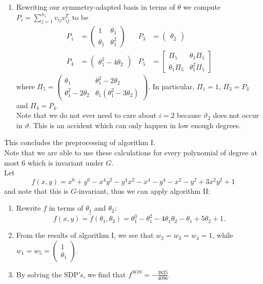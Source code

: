 \documentclass[]{article}
\begin{document}
\begin{enumerate}
    \item Rewriting our symmetry-adapted basis in terms of $\theta$ we compute $P_i=\sum_{j=1}^{n_i} v_{ij}v_{ij}^T$ to be
    \begin{align*}
        P_1&=\begin{pmatrix}1&\theta_1\\\theta_1&\theta_1^2\end{pmatrix}&
        P_3&=\begin{pmatrix}\theta_2\end{pmatrix}\\
        P_4&=\begin{pmatrix}\theta_1^2-4\theta_2\end{pmatrix}&
        P_5&=\begin{bmatrix}\Pi_5&\theta_1\Pi_5\\\theta_1\Pi_5&\theta_1^2\Pi_5\end{bmatrix}
    \end{align*}
    where $\Pi_5=\begin{pmatrix}\theta_1&\theta_1^2-2\theta_2\\\theta_1^2-2\theta_2&\theta_1(\theta_1^2-3\theta_2)\end{pmatrix}$. In particular, $\Pi_1=1$,  $\Pi_3=P_3$ and $\Pi_4=P_4$.\\
    Note that we do not ever need to care about $i=2$ because $\vartheta_2$ does not occur in $\vartheta$. This is an accident which can only happen in low enough degrees.\\
\end{enumerate}

This concludes the preprocessing of algorithm I.\\
Note that we are able to use these calculations for every polynomial of degree at most 6 which is invariant under $G$.\\


Let 
\[
    f(x,y)=x^6+y^6-x^4y^2-y^4x^2-x^4-y^4-x^2-y^2+3x^2y^2+1
\]
and note that this is $G$-invariant, thus we can apply algorithm II:
\begin{enumerate}
    \item Rewrite $f$ in terms of $\theta_1$ and $\theta_2$:
    \[
        f(x,y)=\tilde{f}(\theta_1,\theta_2)=\theta_1^3-\theta_1^2-4\theta_1\theta_2-\theta_1+5\theta_2+1.
    \]

    \item From the results of algorithm I, we see that $w_2=w_3=w_4=1$, while $w_1=w_5=\begin{pmatrix}1\\\theta_1\end{pmatrix}$.
    
    \item By solving the SDP's, we find that $f^{SOS}=-\frac{3825}{4096}$.
\end{enumerate}
\end{document}
